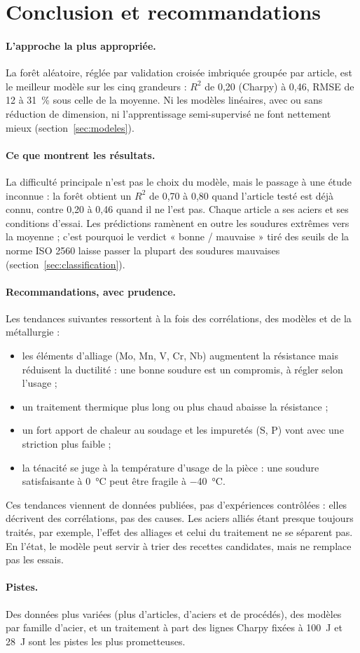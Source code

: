 \section{Conclusion et recommandations}\label{sec:conclusion}

\paragraph{L'approche la plus appropriée.} La forêt aléatoire, réglée par validation
croisée imbriquée groupée par article, est le meilleur modèle sur les cinq grandeurs :
$R^2$ de 0,20 (Charpy) à 0,46, RMSE de 12 à \SI{31}{\percent} sous celle de la moyenne.
Ni les modèles linéaires, avec ou sans réduction de dimension, ni l'apprentissage
semi-supervisé ne font nettement mieux (section~\ref{sec:modeles}).

\paragraph{Ce que montrent les résultats.} La difficulté principale n'est pas le choix du
modèle, mais le passage à une étude inconnue : la forêt obtient un $R^2$ de 0,70 à 0,80
quand l'article testé est déjà connu, contre 0,20 à 0,46 quand il ne l'est pas. Chaque
article a ses aciers et ses conditions d'essai. Les prédictions ramènent en outre les
soudures extrêmes vers la moyenne ; c'est pourquoi le verdict « bonne / mauvaise » tiré
des seuils de la norme ISO 2560 laisse passer la plupart des soudures mauvaises
(section~\ref{sec:classification}).

\paragraph{Recommandations, avec prudence.} Les tendances suivantes ressortent à la fois
des corrélations, des modèles et de la métallurgie :
\begin{itemize}
  \item les éléments d'alliage (Mo, Mn, V, Cr, Nb) augmentent la résistance mais
    réduisent la ductilité : une bonne soudure est un compromis, à régler selon l'usage ;
  \item un traitement thermique plus long ou plus chaud abaisse la résistance ;
  \item un fort apport de chaleur au soudage et les impuretés (S, P) vont avec une
    striction plus faible ;
  \item la ténacité se juge à la température d'usage de la pièce : une soudure
    satisfaisante à \SI{0}{\celsius} peut être fragile à \SI{-40}{\celsius}.
\end{itemize}
Ces tendances viennent de données publiées, pas d'expériences contrôlées : elles
décrivent des corrélations, pas des causes. Les aciers alliés étant presque toujours
traités, par exemple, l'effet des alliages et celui du traitement ne se séparent pas.
En l'état, le modèle peut servir à trier des recettes candidates, mais ne remplace pas
les essais.

\paragraph{Pistes.} Des données plus variées (plus d'articles, d'aciers et de procédés),
des modèles par famille d'acier, et un traitement à part des lignes Charpy fixées à
\SI{100}{\joule} et \SI{28}{\joule} sont les pistes les plus prometteuses.
